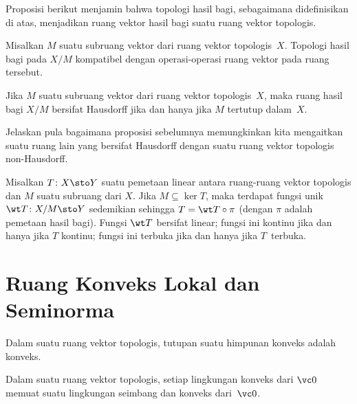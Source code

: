 Proposisi berikut menjamin bahwa topologi hasil bagi, sebagaimana didefinisikan di atas, menjadikan ruang vektor hasil bagi suatu ruang vektor topologis.

\begin{prop} Misalkan $M$ suatu subruang vektor dari ruang vektor topologis~$X$. Topologi hasil bagi pada $X/M$ kompatibel dengan
operasi-operasi ruang vektor pada ruang tersebut.
\end{prop}

\begin{prop} Jika $M$ suatu subruang vektor dari ruang vektor topologis~$X$, maka ruang hasil bagi $X/M$ bersifat Hausdorff jika dan hanya
jika $M$ tertutup dalam~$X$.
\end{prop}

\begin{exer} Jelaskan pula bagaimana proposisi sebelumnya memungkinkan kita mengaitkan suatu ruang lain yang bersifat Hausdorff dengan
suatu ruang vektor topologis non-Hausdorff.
\end{exer}

\begin{prop} Misalkan $T\colon X \sto Y$ suatu pemetaan linear antara ruang-ruang vektor topologis dan $M$ suatu subruang dari $X$. Jika
$M \subseteq \ker T$, maka terdapat fungsi unik $\wt T\colon X/M \sto Y$ sedemikian sehingga $T = \wt T \circ \pi$ (dengan $\pi$
adalah pemetaan hasil bagi). Fungsi $\wt T$ bersifat linear; fungsi ini kontinu jika dan hanya jika $T$ kontinu; fungsi ini terbuka jika dan hanya jika $T$~terbuka.
\end{prop}
















\section{Ruang Konveks Lokal dan Seminorma}

\begin{prop} Dalam suatu ruang vektor topologis, tutupan suatu himpunan konveks adalah konveks.
\end{prop}

\begin{prop} Dalam suatu ruang vektor topologis, setiap lingkungan konveks dari $\vc 0$ memuat suatu lingkungan seimbang dan konveks dari~$\vc 0$.
\end{prop}

